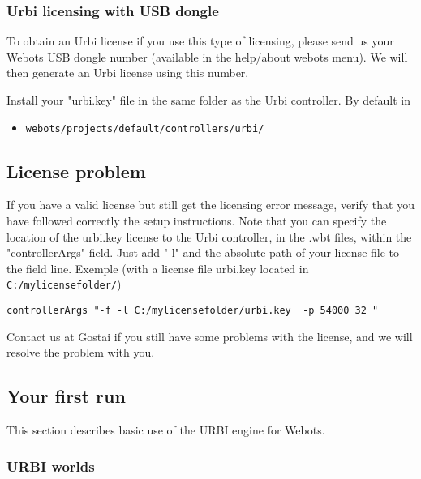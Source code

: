 \subsubsection{Urbi licensing with USB dongle}
\label{webots.license.dongleusb}%

To obtain an Urbi license if you use this type of licensing, please
send us your Webots USB dongle number (available in the help/about
webots menu). We will then generate an Urbi license using this number.


Install your "urbi.key" file in the same folder as the Urbi
controller.  By default in
\begin{itemize}

\item  \nolinkurl{webots/projects/default/controllers/urbi/}

\end{itemize}


\subsection{License problem}
\label{webots.problem}%

If you have a valid license but still get the licensing error message,
verify that you have followed correctly the setup instructions. Note
that you can specify the location of the urbi.key license to the Urbi
controller, in the .wbt files, within the "controllerArgs" field. Just
add "-{}l" and the absolute path of your license file to the field
line. Exemple (with a license file urbi.key located in
\nolinkurl{C:/mylicensefolder/})

\begin{lstlisting}[firstnumber=1,]
controllerArgs "-f -l C:/mylicensefolder/urbi.key  -p 54000 32 "
\end{lstlisting}
Contact us at Gostai if you still have some problems with the license,
and we will resolve the problem with you.


\subsection{Your first run}
\label{webots.firstrun}%

This section describes basic use of the URBI engine for Webots.


\subsubsection{URBI worlds}
\label{webots.firstrun.openworld}%

